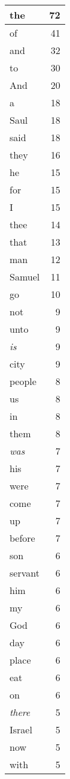 \begin{center}
\begin{longtable}{l|r}
\hline \hline
\endlastfoot
the & 72 \\ \hline
of & 41 \\ \hline
and & 32 \\ \hline
to & 30 \\ \hline
And & 20 \\ \hline
a & 18 \\ \hline
Saul & 18 \\ \hline
said & 18 \\ \hline
they & 16 \\ \hline
he & 15 \\ \hline
for & 15 \\ \hline
I & 15 \\ \hline
thee & 14 \\ \hline
that & 13 \\ \hline
man & 12 \\ \hline
Samuel & 11 \\ \hline
go & 10 \\ \hline
not & 9 \\ \hline
unto & 9 \\ \hline
\emph{is} & 9 \\ \hline
city & 9 \\ \hline
people & 8 \\ \hline
us & 8 \\ \hline
in & 8 \\ \hline
them & 8 \\ \hline
\emph{was} & 7 \\ \hline
his & 7 \\ \hline
were & 7 \\ \hline
come & 7 \\ \hline
up & 7 \\ \hline
before & 7 \\ \hline
son & 6 \\ \hline
servant & 6 \\ \hline
him & 6 \\ \hline
my & 6 \\ \hline
God & 6 \\ \hline
day & 6 \\ \hline
place & 6 \\ \hline
eat & 6 \\ \hline
on & 6 \\ \hline
\emph{there} & 5 \\ \hline
Israel & 5 \\ \hline
now & 5 \\ \hline
with & 5 \\ \hline

\end{longtable}
\end{center}
